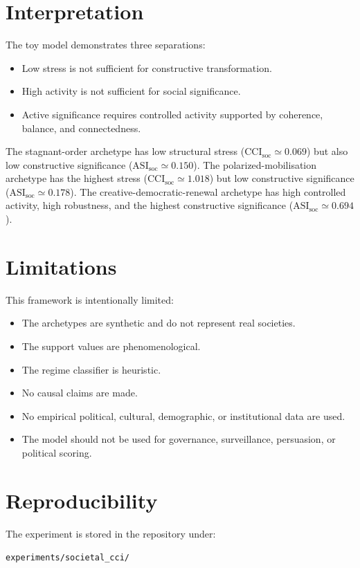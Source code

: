 \documentclass[11pt,a4paper]{article}
\newcommand{\CCIsoc}{\mathrm{CCI}_{\mathrm{soc}}}
\newcommand{\ASIsoc}{\mathrm{ASI}_{\mathrm{soc}}}
\begin{document}
\section{Interpretation}

The toy model demonstrates three separations:
\begin{itemize}[leftmargin=1.5em]
\item Low stress is not sufficient for constructive transformation.
\item High activity is not sufficient for social significance.
\item Active significance requires controlled activity supported by coherence,
balance, and connectedness.
\end{itemize}

The stagnant-order archetype has low structural stress
($\CCIsoc\simeq0.069$) but also low constructive significance
($\ASIsoc\simeq0.150$).
The polarized-mobilisation archetype has the highest stress
($\CCIsoc\simeq1.018$) but low constructive significance
($\ASIsoc\simeq0.178$).
The creative-democratic-renewal archetype has high controlled activity,
high robustness, and the highest constructive significance
($\ASIsoc\simeq0.694$).

\section{Limitations}

This framework is intentionally limited:
\begin{itemize}[leftmargin=1.5em]
\item The archetypes are synthetic and do not represent real societies.
\item The support values are phenomenological.
\item The regime classifier is heuristic.
\item No causal claims are made.
\item No empirical political, cultural, demographic, or institutional data are
used.
\item The model should not be used for governance, surveillance, persuasion,
or political scoring.
\end{itemize}

\section{Reproducibility}

The experiment is stored in the repository under:
\begin{center}
\texttt{experiments/societal\_cci/}
\end{center}
\end{document}
